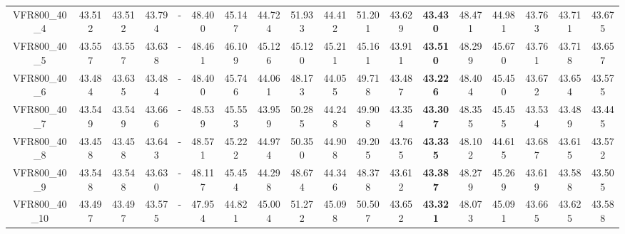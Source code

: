 \begin{tabular}{cc|ccc|ccccccccccccc}
VFR800\_40\_4      & 43.512           & 43.512           & 43.794           & -                & 48.400           & 45.147           & 44.724           & 51.933           & 44.412           & 51.201           & 43.629           & {\bf 43.430}     & 48.471           & 44.981           & 43.763           & 43.711           & 43.675          \\ 
VFR800\_40\_5      & 43.557           & 43.557           & 43.638           & -                & 48.461           & 46.109           & 45.126           & 45.120           & 45.211           & 45.161           & 43.911           & {\bf 43.510}     & 48.299           & 45.670           & 43.761           & 43.718           & 43.657          \\ 
VFR800\_40\_6      & 43.484           & 43.635           & 43.484           & -                & 48.400           & 45.746           & 44.061           & 48.173           & 44.055           & 49.718           & 43.487           & {\bf 43.226}     & 48.404           & 45.450           & 43.672           & 43.654           & 43.575          \\ 
VFR800\_40\_7      & 43.549           & 43.549           & 43.666           & -                & 48.539           & 45.553           & 43.959           & 50.285           & 44.248           & 49.908           & 43.354           & {\bf 43.307}     & 48.355           & 45.455           & 43.534           & 43.489           & 43.445          \\ 
VFR800\_40\_8      & 43.458           & 43.458           & 43.643           & -                & 48.571           & 45.222           & 44.974           & 50.350           & 44.908           & 49.205           & 43.765           & {\bf 43.335}     & 48.102           & 44.615           & 43.687           & 43.615           & 43.572          \\ 
VFR800\_40\_9      & 43.548           & 43.548           & 43.630           & -                & 48.117           & 45.454           & 44.298           & 48.674           & 44.346           & 48.378           & 43.612           & {\bf 43.387}     & 48.279           & 45.269           & 43.619           & 43.588           & 43.505          \\ 
VFR800\_40\_10     & 43.497           & 43.497           & 43.575           & -                & 47.954           & 44.821           & 45.004           & 51.272           & 45.098           & 50.507           & 43.652           & {\bf 43.321}     & 48.073           & 45.091           & 43.665           & 43.625           & 43.588          \\ 

\end{tabular}
